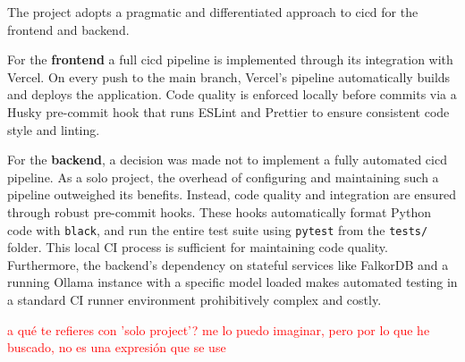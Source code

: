 The project adopts a pragmatic and differentiated approach to \acs{cicd} for the frontend and backend.

For the \textbf{frontend} a full \acs{cicd} pipeline is implemented through its integration with Vercel. On every push to the main branch, Vercel's pipeline automatically builds and deploys the application. Code quality is enforced locally before commits via a Husky pre-commit hook that runs ESLint and Prettier to ensure consistent code style and linting.

For the \textbf{backend}, a decision was made not to implement a fully automated \acs{cicd} pipeline. As a solo project, the overhead of configuring and maintaining such a pipeline outweighed its benefits. Instead, code quality and integration are ensured through robust pre-commit hooks. These hooks automatically format Python code with \texttt{black}, and run the entire test suite using \texttt{pytest} from the \texttt{tests/} folder. This local CI process is sufficient for maintaining code quality. Furthermore, the backend's dependency on stateful services like FalkorDB and a running Ollama instance with a specific model loaded makes automated testing in a standard CI runner environment prohibitively complex and costly.

\textcolor{red}{a qué te refieres con 'solo project'? me lo puedo imaginar, pero por lo que he buscado, no es una expresión que se use}